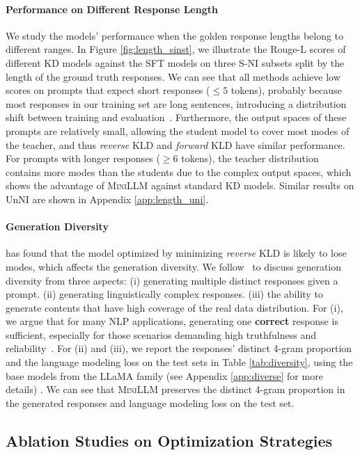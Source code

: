 \documentclass{article}
\begin{document}
\paragraph{Performance on Different Response Length} We study the models' performance when the golden response lengths belong to different ranges. In Figure \ref{fig:length_sinst}, we illustrate the Rouge-L scores of different KD models against the SFT models on three S-NI subsets split by the length of the ground truth responses. We can see that all methods achieve low scores on prompts that expect short responses ($\le 5$ tokens), probably because most responses in our training set are long sentences, introducing a distribution shift between training and evaluation~\citep{ITGPT4}. Furthermore, the output spaces of these prompts are relatively small, allowing the student model to cover most modes of the teacher, and thus \textit{reverse} KLD and \textit{forward} KLD have similar performance. For prompts with longer responses ($\ge 6$ tokens), the teacher distribution contains more modes than the students due to the complex output spaces, which shows the advantage of \textsc{MiniLLM} against standard KD models. Similar results on UnNI are shown in Appendix \ref{app:length_uni}.

\paragraph{Generation Diversity} \cite{gan_falling_short} has found that the model optimized by minimizing \textit{reverse} KLD is likely to lose modes, which affects the generation diversity. We follow~\cite{cold} to discuss generation diversity from three aspects:
(i) generating multiple distinct responses given a prompt. (ii) generating linguistically complex responses. (iii) the ability to generate contents that have high coverage of the real data distribution. For (i), we argue that for many NLP applications, generating one \textbf{correct} response is sufficient, especially for those scenarios demanding high truthfulness and reliability~\citep{halu_survey}. For (ii) and (iii), we report the responses' distinct 4-gram proportion and the language modeling loss on the test sets in Table \ref{tab:diversity}, using the base models from the LLaMA family (see Appendix \ref{app:diverse} for more details) . We can see that \textsc{MiniLLM} preserves the distinct 4-gram proportion in the generated responses and language modeling loss on the test set.


\subsection{Ablation Studies on Optimization Strategies}
\end{document}
